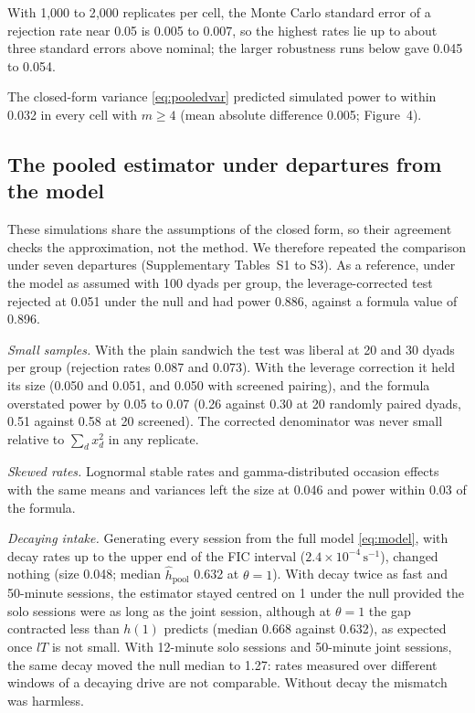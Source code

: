 \documentclass[12pt]{article}
\begin{document}
With 1{,}000 to 2{,}000 replicates per cell, the Monte Carlo standard error of a
rejection rate near 0.05 is 0.005 to 0.007, so the highest rates lie up to about
three standard errors above nominal; the larger robustness runs below gave 0.045 to
0.054.

The closed-form variance \eqref{eq:pooledvar} predicted simulated power to within
0.032 in every cell with $m\geq4$ (mean absolute difference 0.005; Figure~4).

\subsection*{The pooled estimator under departures from the model}

These simulations share the assumptions of the closed form, so their agreement
checks the approximation, not the method. We therefore repeated the comparison
under seven departures (Supplementary Tables~S1 to S3). As a reference, under the model as
assumed with 100 dyads per group, the leverage-corrected test rejected at 0.051
under the null and had power 0.886, against a formula value of 0.896.

\emph{Small samples.} With the plain sandwich the test was liberal at 20 and 30
dyads per group (rejection rates 0.087 and 0.073). With the leverage correction it
held its size (0.050 and 0.051, and 0.050 with screened pairing), and the formula
overstated power by 0.05 to 0.07 (0.26 against 0.30 at 20 randomly paired dyads,
0.51 against 0.58 at 20 screened). The corrected denominator was never small
relative to $\sum_dx_d^2$ in any replicate.

\emph{Skewed rates.} Lognormal stable rates and gamma-distributed occasion effects
with the same means and variances left the size at 0.046 and power within 0.03 of
the formula.

\emph{Decaying intake.} Generating every session from the full model
\eqref{eq:model}, with decay rates up to the upper end of the FIC interval
($2.4\times10^{-4}\,\mathrm{s}^{-1}$), changed nothing (size 0.048; median
$\hat h_{\mathrm{pool}}$ 0.632 at $\theta=1$). With decay twice as fast and
50-minute sessions, the estimator stayed centred on 1 under the null provided the
solo sessions were as long as the joint session, although at $\theta=1$ the gap
contracted less than $h(1)$ predicts (median 0.668 against 0.632), as expected once
$lT$ is not small. With 12-minute solo sessions and 50-minute joint sessions, the
same decay moved the null median to 1.27: rates measured over different windows of
a decaying drive are not comparable. Without decay the mismatch was harmless.
\end{document}
